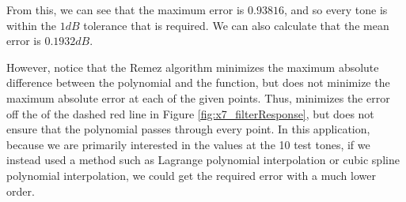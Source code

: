 \vspace{-2pt}

From this, we can see that the maximum error is $0.93816$, and so every tone is within the $1 \unit{dB}$ tolerance that is required.  We can also calculate that the mean error is $0.1932 \unit{dB}$.  

However, notice that the Remez algorithm minimizes the maximum absolute difference between the polynomial and the function, but does not minimize the maximum absolute error at each of the given points.  Thus,  minimizes the error off the of the dashed red line in Figure \ref{fig:x7_filterResponse}, but does not ensure that the polynomial passes through every point.  In this application, because we are primarily interested in the values at the 10 test tones, if we instead used a method such as Lagrange polynomial interpolation or cubic spline polynomial interpolation, we could get the required error with a much lower order.
